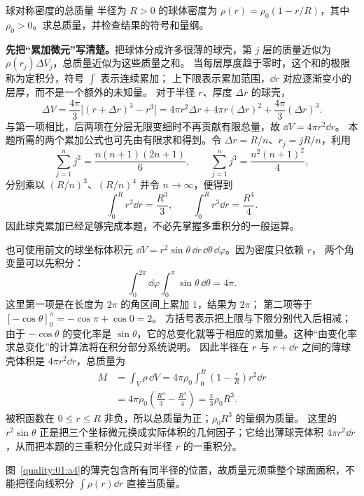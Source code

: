 \begin{origexamplebox}{球对称密度的总质量}
半径为 $R>0$ 的球体密度为 $\rho(r)=\rho_0(1-r/R)$，其中 $\rho_0>0$。求总质量，并检查结果的符号和量纲。

\end{origexamplebox}
\begin{xesolution}
\textbf{先把“累加微元”写清楚。}把球体分成许多很薄的球壳，第 $j$ 层的质量近似为
$\rho(r_j)\Delta V_j$，总质量近似为这些质量之和。
当每层厚度趋于零时，这个和的极限称为定积分，符号 $\int$ 表示连续累加；
上下限表示累加范围，$\dd r$ 对应逐渐变小的层厚，而不是一个额外的未知量。
对于半径 $r$、厚度 $\Delta r$ 的球壳，
\[
 \Delta V=\frac{4\pi}{3}\bigl[(r+\Delta r)^3-r^3\bigr]
 =4\pi r^2\Delta r+4\pi r(\Delta r)^2+\frac{4\pi}{3}(\Delta r)^3.
\]
与第一项相比，后两项在分层无限变细时不再贡献有限总量，故 $\dd V=4\pi r^2\dd r$。
本题所需的两个累加公式也可先由有限求和得到。令 $\Delta r=R/n$、$r_j=jR/n$，利用
\[
 \sum_{j=1}^n j^2=\frac{n(n+1)(2n+1)}6,\qquad
 \sum_{j=1}^n j^3=\frac{n^2(n+1)^2}4,
\]
分别乘以 $(R/n)^3$、$(R/n)^4$ 并令 $n\to\infty$，便得到
\[
 \int_0^R r^2\dd r=\frac{R^3}{3},\qquad
 \int_0^R r^3\dd r=\frac{R^4}{4}.
\]
因此球壳累加已经足够完成本题，不必先掌握多重积分的一般运算。

也可使用前文的球坐标体积元
$\dd V=r^2\sin\theta\,\dd r\,\dd\theta\,\dd\varphi$。因为密度只依赖 $r$，
两个角变量可以先积分：
\[
 \int_0^{2\pi}\!\dd\varphi
 \int_0^\pi\!\sin\theta\,\dd\theta=4\pi.
\]
这里第一项是在长度为 $2\pi$ 的角区间上累加 $1$，结果为 $2\pi$；
第二项等于 $[-\cos\theta]_0^\pi=-\cos\pi+\cos0=2$。
方括号表示把上限与下限分别代入后相减；由于 $-\cos\theta$ 的变化率是
$\sin\theta$，它的总变化就等于相应的累加量。这种“由变化率求总变化”的计算法将在积分部分系统说明。
因此半径在 $r$ 与 $r+\dd r$ 之间的薄球壳体积是 $4\pi r^2\dd r$，总质量为
\begin{align*}
 M&=\int_V\rho\,\dd V
 =4\pi\rho_0\int_0^R\left(1-\frac rR\right)r^2\dd r\\
 &=4\pi\rho_0\left(\frac{R^3}{3}-\frac{R^3}{4}\right)
 =\boxed{\frac{\pi}{3}\rho_0R^3}.
\end{align*}
被积函数在 $0\le r\le R$ 非负，所以总质量为正；$\rho_0R^3$ 的量纲为质量。
这里的 $r^2\sin\theta$ 正是把三个坐标微元换成实际体积的几何因子；它给出薄球壳体积
$4\pi r^2\dd r$，从而把本题的三重积分化成只对半径 $r$ 的一重积分。


图~\ref{quality:01:a4}的薄壳包含所有同半径的位置，故质量元须乘整个球面面积，不能把径向线积分 $\int\rho(r)\dd r$ 直接当质量。
\end{xesolution}


